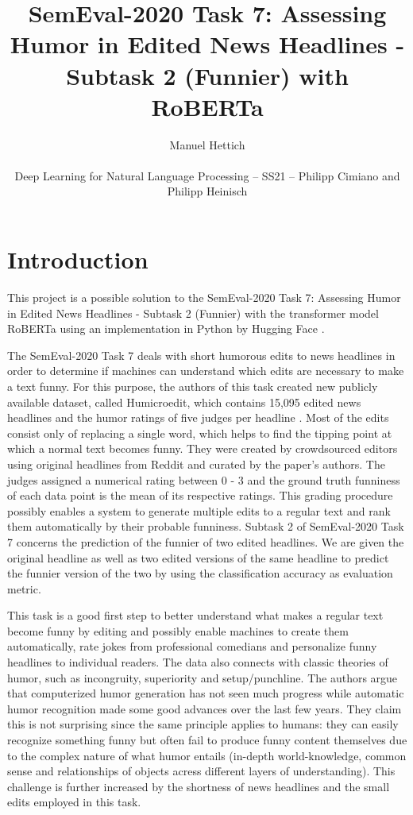 \documentclass[11pt,a4paper,onecolumn,oneside,notitlepage]{article}
\author{Manuel Hettich\\

	\begin{small}
		Deep Learning for Natural Language Processing -- SS21 -- Philipp Cimiano and Philipp Heinisch
	\end{small}
}
\title{SemEval-2020 Task 7: Assessing Humor in Edited News Headlines - Subtask 2 (Funnier) with RoBERTa}
\begin{document}
	\maketitle


	\section{Introduction}
	This project is a possible solution to the SemEval-2020 Task 7: Assessing Humor in Edited News Headlines - Subtask 2 (Funnier) with the transformer model RoBERTa \citep{DBLP:journals/corr/abs-1907-11692} using an implementation in Python by Hugging Face \citep{wolf-etal-2020-transformers}.

	The SemEval-2020 Task 7 deals with short humorous edits to news headlines in order to determine if machines can understand which edits are necessary to make a text funny. For this purpose, the authors of this task created new publicly available dataset, called Humicroedit, which contains 15,095 edited news headlines and the humor ratings of five judges per headline \citep{hossain-etal-2019-president}. Most of the edits consist only of replacing a single word, which helps to find the tipping point at which a normal text becomes funny. They were created by crowdsourced editors using original headlines from Reddit and curated by the paper's authors. The judges assigned a numerical rating between 0 - 3 and the ground truth funniness of each data point is the mean of its respective ratings. This grading procedure possibly enables a system to generate multiple edits to a regular text and rank them automatically by their probable funniness. Subtask 2 of SemEval-2020 Task 7 concerns the prediction of the funnier of two edited headlines. We are given the original headline as well as two edited versions of the same headline to predict the funnier version of the two by using the classification accuracy as evaluation metric.

	This task is a good first step to better understand what makes a regular text become funny by editing and possibly enable machines to create them automatically, rate jokes from professional comedians and personalize funny headlines to individual readers. The data also connects with classic theories of humor, such as incongruity, superiority and setup/punchline. The authors argue that computerized humor generation has not seen much progress while automatic humor recognition made some good advances over the last few years. They claim this is not surprising since the same principle applies to humans: they can easily recognize something funny but often fail to produce funny content themselves due to the complex nature of what humor entails (in-depth world-knowledge, common sense and relationships of objects acress different layers of understanding). This challenge is further increased by the shortness of news headlines and the small edits employed in this task.
\end{document}
